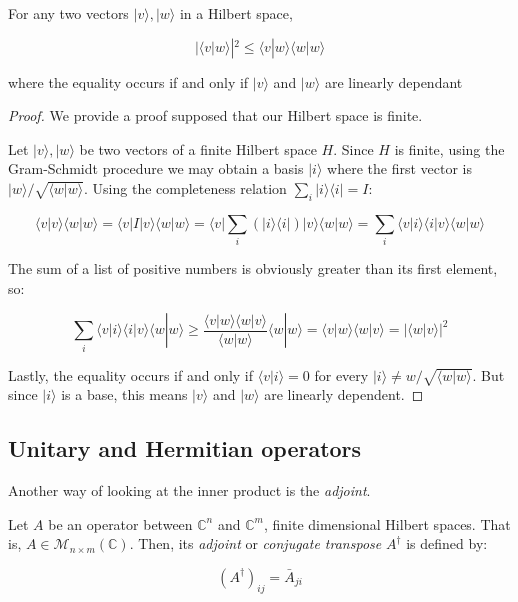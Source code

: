 \begin{corollary}
	For any two vectors $|v\rangle, |w\rangle$ in a Hilbert space,
	
	$$|\langle v|w\rangle|^2 \leq \langle v|w\rangle\langle w|w\rangle$$
	
	where the equality occurs if and only if $|v\rangle$ and $|w\rangle$ are linearly dependant
\end{corollary}
\begin{proof} 
	
	We provide a proof supposed that our Hilbert space is finite.
	
	Let $|v\rangle, |w\rangle$ be two vectors of a finite Hilbert space $H$. Since $H$ is finite, using the Gram-Schmidt procedure we may obtain a basis $|i\rangle$ where the first vector is $|w\rangle / \sqrt{\langle w|w\rangle}$. Using the completeness relation $\sum_i |i\rangle \langle i| = I$:
	
	$$\langle v|v\rangle \langle w|w\rangle = \langle v|I|v\rangle \langle w|w\rangle = \langle v| \sum_i (|i\rangle \langle i|) |v\rangle \langle w|w\rangle = \sum_i \langle v|i\rangle \langle i|v\rangle \langle w|w\rangle $$
	
	The sum of a list of positive numbers is obviously greater than its first element, so:
	
	$$ \sum_i \langle v|i\rangle \langle i|v\rangle \langle w|w\rangle \geq  \frac{\langle v|w\rangle \langle w|v\rangle}{\langle w|w\rangle} \langle w|w\rangle = \langle v|w\rangle \langle w|v\rangle  = | \langle w|v\rangle |^2 $$
	
	Lastly, the equality occurs if and only if $\langle v|i\rangle = 0$ for every $|i\rangle \neq w / \sqrt{\langle w|w\rangle}$. But since $|i\rangle$ is a base, this means $|v\rangle$ and $|w\rangle$ are linearly dependent.
	
\end{proof}


\subsection{Unitary and Hermitian operators}


Another way of looking at the inner product is the \emph{adjoint}.

\begin{definition}
	Let $A$ be an operator between $\mathds{C}^n$ and $\mathds{C}^m$, finite dimensional Hilbert spaces. That is, $A \in \mathcal{M}_{n{\times}m}(\mathds{C})$. Then, its \emph{adjoint} or \emph{conjugate transpose} $A^\dagger$ is defined by:
	
	$$ (A^\dagger)_{ij} = \bar A_{ji} $$
\end{definition}

